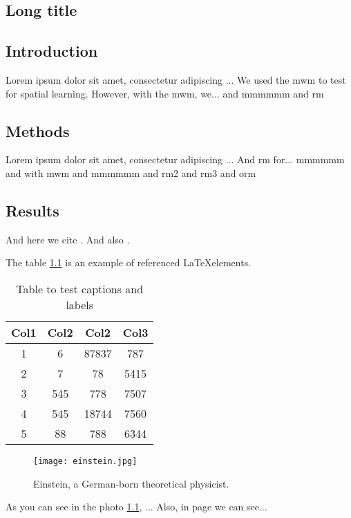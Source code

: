 \begin{refsection} %
\chapter[Short title]{Long title}

\section{Introduction}
Lorem ipsum dolor sit amet, consectetur adipiscing ...
We used the \acrfull{mwm} to test for spatial learning. However, with the \acrshort{mwm}, we... and \acrshort{mmmmmm} and \acrshort{rm}
\section{Methods}
Lorem ipsum dolor sit amet, consectetur adipiscing ... And \acrfull{rm} for... \acrfull{mmmmmm} and with \acrshort{mwm}
and \acrlong{mmmmmm} and \acrshort{rm2} and \acrshort{rm3} and \acrshort{orm}
\section{Results} 
And here we cite \cite{Famoye2015}. And also \citeauthor{Famoye2015}. 

The table \ref{table:1} is an example of referenced \LaTeX elements.

\begin{table}[h!]
	\centering
	\begin{tabular}{||c c c c||} 
		\hline
		Col1 & Col2 & Col2 & Col3 \\ [0.5ex] 
		\hline\hline
		1 & 6 & 87837 & 787 \\ 
		2 & 7 & 78 & 5415 \\
		3 & 545 & 778 & 7507 \\
		4 & 545 & 18744 & 7560 \\
		5 & 88 & 788 & 6344 \\ [1ex] 
		\hline
	\end{tabular}
	\caption{Table to test captions and labels}
	\label{table:1}
\end{table}

\begin{figure}[ht]
	\centering
	\texttt{[image: einstein.jpg]}
	\caption[Einstein]{Einstein, a German-born theoretical physicist.}
	\centering
	\label{fig:1}
\end{figure}

As you can see in the photo \ref{fig:1}, ... Also, in page \pageref{fig:1}  we can see...


\end{refsection}
